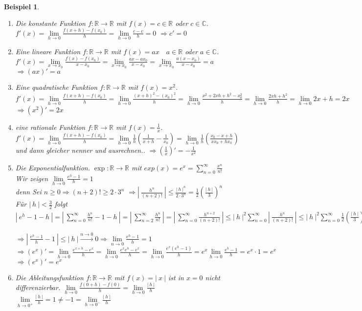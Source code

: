\documentclass[a4paper,titlepage,oneside]{article}
\def\C{\ensuremath{\mathbb{C}} }
\def\R{\ensuremath{\mathbb{R}} }
\def\e{\ensuremath{\mathit{e}} }
\newcommand{\suminf}[2][n]{\ensuremath{\sum_{#1= 0}^{\infty}{#2}}}
\newcommand{\limnull}[2][n]{\ensuremath{\lim\limits_{#1 \rightarrow 0}{#2}}}
\newcommand{\limAB}[3][x]{\ensuremath{\lim\limits_{#1 \rightarrow #2}{#3}}}
\newcommand{\limA}[2][x_0]{\limAB{#1}{#2}}
\newcommand{\limpos}[3][n]{\ensuremath{\lim\limits_{#1 \rightarrow #2^+}{#3}}}
\newcommand{\limneg}[3][n]{\ensuremath{\lim\limits_{#1 \rightarrow #2^-}{#3}}}
\newcommand{\abs}[1]{\ensuremath{\left|\:#1\:\right|}}
\newcommand{\longtonull}[1][n]{\ensuremath{\overset{\scriptscriptstyle{#1 \to 0}}{\longrightarrow}}}
\theoremstyle{thmstyle}
\newtheorem{bsp}[satz]{Beispiel}
\theoremstyle{subthmstyle}
\begin{document}
\begin{bsp}
\begin{enumerate}
\item Die konstante Funktion
$f: \R \to \R$ mit $ f(x) = c \in \R $ oder $ c \in \C $. $f'(x) = \limnull[h]{\frac{f(x + h) - f(x_0)}{h}} = \limnull[h]{\frac{c-c}{h}} = 0$
$\Rightarrow c' = 0$
\item Eine lineare Funktion
$f: \R \to \R$ mit $ f(x) = ax \quad a \in \R $ oder $ a \in \C $. $f'(x) = \limA{\frac{f(x) - f(x_0)}{x-x_0}} = \limA{\frac{ax - ax_0}{x-x_0}} = \limA{\frac{a(x-x_0)}{x-x_0}} = a$
$\Rightarrow (ax)' = a$
\item Eine quadratische Funktion
$f: \R \to \R$ mit $ f(x) = x^2 $. $f'(x) = \limnull[h]{\frac{f(x + h) - f(x_0)}{h}} = \limnull[h]{\frac{(x + h)^2 - (x_0)^2}{h}} = \limnull[h]{\frac{x^2 + 2xh + h^2 - x_0^2}{h}} =  \limnull[h]{\frac{2xh + h^2}{h}} = \limnull[h]{2x + h}  = 2x$
$\Rightarrow (x^2)' = 2x$
\item eine rationale Funktion
$f: \R \to \R$ mit $ f(x) = \frac{1}{x} $. $f'(x) = \limnull[h]{\frac{f(x + h) - f(x_0)}{h}} = \limnull[h]{\frac{1}{h}\left(\frac{1}{x + h} - \frac{1}{x_0}\right)} = \limnull[h]{\frac{1}{h}\left(\frac{x_0- x +h}{xx_0 + hx_0}\right)} $ und dann gleicher nenner und ausrechnen..
$\Rightarrow \left(\frac{1}{x}\right)' = -\frac{1}{x^2}$
\item Die Exponentialfunktion.
$\exp: \R \to \R$ mit $exp(x) = \e^x = \suminf{\frac{x^n}{n!}}$ \\
Wir zeigen $\limnull[h]{\frac{e^h - 1}{h}} = 1$\\
denn Sei $n \ge 0 \Rightarrow (n+2)! \ge 2 \cdot 3^n$
$\Rightarrow \abs{\frac{h^n}{(n+2)!}} \le \frac{\abs{h}^n}{2\cdot 3^n} = \frac{1}{2}\left(\frac{\abs{h}}{3}\right)^n$\\
Für $\displaystyle \abs{h} < \frac{3}{2}$ folgt $ \abs{\e^h - 1 - h} = \abs{\suminf{\frac{h^n}{n!}} - 1- h} = \abs{\sum_{n=2}^{\infty}{\frac{h^n}{n!}}} = \abs{\suminf{\frac{h^{n+2}}{(n+2)!}}} \le \abs{h}^2 \suminf{\abs{\frac{h^n}{(n+2)!}}} \le \abs{h}^2\suminf{\frac{1}{2}\left(\frac{\abs{h}}{3}\right)^h} = \frac{\abs{h}^2}{2}\suminf{\underbrace{\left(\frac{\abs{h}}{3}\right)^h}_{<1}} \overset{\text{geometrische Reihe}}{=} = \frac{\abs{h}^2}{2} \frac{1}{1-\underbrace{\frac{\abs{h}}{3}}_{< \frac{1}{2}}} \le \abs{h^2}$\\
$\Rightarrow \abs{\frac{e^h - 1}{h} - 1} \le \abs{h} \longtonull 0 \Rightarrow \limnull{\frac{e^h - 1}{h}} = 1$ \\
$\Rightarrow (\e^x)' = \limnull[h]{\frac{\e^{x+h} - \e^x}{h}} = \limnull[h]{\frac{\e^x\e^h-\e^x}{h}} = \limnull[h]{\frac{\e^x(\e^h-1)}{h}} = \e^x\limnull[h]{\frac{\e^h-1}{h}} = \e^x \cdot 1 = \e^x$\\
$\Rightarrow (\e^x)' = \e^x $
\item Die Ableitungsfunktion
$f: \R \to \R$ mit $ f(x) = \abs{x} $ ist in $ x = 0$ nicht differenzierbar. $\limnull[h]{\frac{f(0 + h) - f(0)}{h}} = \limnull[h]{\frac{\abs{h}}{h}}$\\
$\limpos[h]{0}{\frac{\abs{h}}{h}} = 1 \ne -1 = \limneg[h]{0}{\frac{\abs{h}}{h}}$
\end{enumerate}
\end{bsp}
\end{document}
